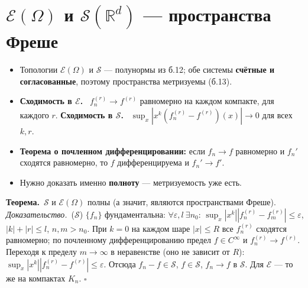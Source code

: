 \documentclass[11pt,a4paper]{article}
\newcommand{\RR}{\mathbb R}
\newcommand{\EE}{\mathcal E}
\newcommand{\Sc}{\mathcal S}
\newcommand{\df}[1]{\textbf{#1.}~}
\newcommand{\thm}{\textbf{Теорема.}~}
\newcommand{\pf}{\textit{Доказательство.}~}
\newcommand{\qedd}{\hfill$\square$}
\begin{document}
\section{$\EE(\Omega)$ и $\Sc(\RR^d)$ — пространства Фреше}
\begin{defs}
\begin{itemize}
\item Топологии $\EE(\Omega)$ и $\Sc$ — полунормы из б.12; обе системы \textbf{счётные и согласованные}, поэтому пространства метризуемы (б.13).
\item \df{Сходимость в $\EE$} $f_n^{(r)}\to f^{(r)}$ равномерно на каждом компакте, для каждого $r$. \df{Сходимость в $\Sc$} $\sup_x|x^k(f_n^{(r)}-f^{(r)})(x)|\to0$ для всех $k,r$.
\item \textbf{Теорема о почленном дифференцировании:} если $f_n\to f$ равномерно и $f_n'$ сходятся равномерно, то $f$ дифференцируема и $f_n'\to f'$.
\item Нужно доказать именно \textbf{полноту} — метризуемость уже есть.
\end{itemize}
\end{defs}

\thm $\Sc$ и $\EE(\Omega)$ полны (а значит, являются пространствами Фреше).\\
\pf ($\Sc$) $\{f_n\}$ фундаментальна: $\forall\varepsilon,l\ \exists n_0$: $\sup_x|x^k||f_n^{(r)}-f_m^{(r)}|\le\varepsilon$, $|k|+|r|\le l$, $n,m>n_0$. При $k=0$ на каждом шаре $|x|\le R$ все $f_n^{(r)}$ сходятся равномерно; по почленному дифференцированию предел $f\in C^\infty$ и $f_n^{(r)}\to f^{(r)}$. Переходя к пределу $m\to\infty$ в неравенстве (оно не зависит от $R$): $\sup_x|x^k||f_n^{(r)}-f^{(r)}|\le\varepsilon$. Отсюда $f_n-f\in\Sc$, $f\in\Sc$, $f_n\to f$ в $\Sc$. Для $\EE$ — то же на компактах $K_n$. \qedd
\end{document}
